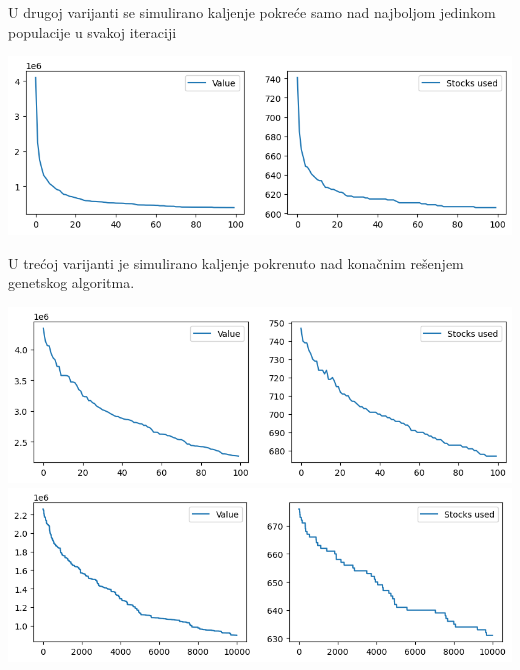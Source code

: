 \documentclass[12pt, a4paper]{article}
\begin{document}
U drugoj varijanti se simulirano kaljenje pokreće samo nad najboljom jedinkom populacije u svakoj iteraciji

\vspace{0.5cm}
\begin{center}
  \hspace{1cm}
  \includegraphics[width=\linewidth]{img/ga_sa_2.png}
  \hspace{1cm} 
\end{center}
\vspace{0.5cm}

U trećoj varijanti je simulirano kaljenje pokrenuto nad konačnim rešenjem genetskog algoritma.

\vspace{0.5cm}
\begin{center}
  \hspace{1cm}
  \includegraphics[width=\linewidth]{img/ga_sa_3.png}
  \includegraphics[width=\linewidth]{img/ga_sa_3_part2.png}
  \hspace{1cm} 
\end{center}
\vspace{0.5cm}
\end{document}
